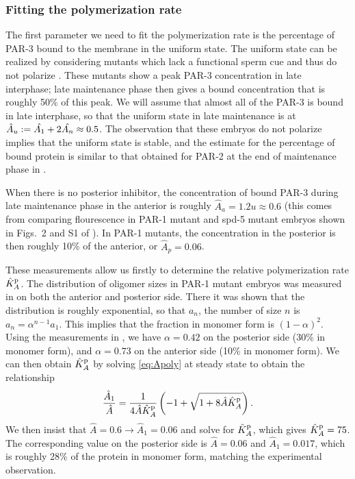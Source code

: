 \documentclass[11pt]{article}
\newcommand{\6}[1]{#1_{\text{6}}}
\newcommand{\3}[1]{#1_{\text{3}}}
\begin{document}
\subsubsection{Fitting the polymerization rate}
The first parameter we need to fit the polymerization rate is the percentage of PAR-3 bound to the membrane in the uniform state. The uniform state can be realized by considering mutants which lack a functional sperm cue and thus do not polarize \cite[Fig.~S1]{lang2023oligomerization}. These mutants show a peak PAR-3 concentration in late interphase; late maintenance phase then gives a bound concentration that is roughly 50\% of this peak. We will assume that almost all of the PAR-3 is bound in late interphase, so that the uniform state in late maintenance is at $\hat A_u:=\hat{A_1}+2\hat{A_n} \approx 0.5$. The observation that these embryos do not polarize implies that the uniform state is stable, and the estimate for the percentage of bound protein is similar to that obtained for PAR-2 at the end of maintenance phase in \cite[Fig.~S3]{gross2019guiding}. 

When there is no posterior inhibitor, the concentration of bound PAR-3 during late maintenance phase in the anterior is roughly $\hat A_a=1.2u \approx 0.6$ (this comes from comparing flourescence in PAR-1 mutant and spd-5 mutant embryos shown in Figs.\ 2 and S1 of \cite{lang2023oligomerization}). In PAR-1 mutants, the concentration in the posterior is then roughly 10\% of the anterior, or $\hat A_p=0.06$. 

These measurements allow us firstly to determine the relative polymerization rate $\hat{K}^\text{p}_A$. The distribution of oligomer sizes in PAR-1 mutant embryos was measured in \cite{lang2023oligomerization} on both the anterior and posterior side. There it was shown that the distribution is roughly exponential, so that $a_n$, the number of size $n$ is $a_n=\alpha^{n-1} a_1$. This implies that the fraction in monomer form is $\left(1-\alpha\right)^2$. Using the measurements in \cite{lang2023oligomerization}, we have $\alpha=0.42$ on the posterior side (30\% in monomer form), and $\alpha=0.73$ on the anterior side (10\% in monomer form). We can then obtain $\hat{K}^\text{p}_A$ by solving \eqref{eq:Apoly} at steady state to obtain the relationship
\begin{equation}
\frac{\hat A_1}{\hat A} = \frac{1}{4 \hat A \hat{K}^\text{p}_A}\left(-1+\sqrt{1+8 \hat A \hat{K}^\text{p}_A}\right).
\end{equation}
We then insist that $\hat A=0.6 \rightarrow \hat A_1=0.06$ and solve for $\hat{K}^\text{p}_A$, which gives $\hat{K}^\text{p}_A=75$. The corresponding value on the posterior side is $\hat A = 0.06$ and $\hat A_1=0.017$, which is roughly 28\% of the protein in monomer form, matching the experimental observation.
\end{document}
